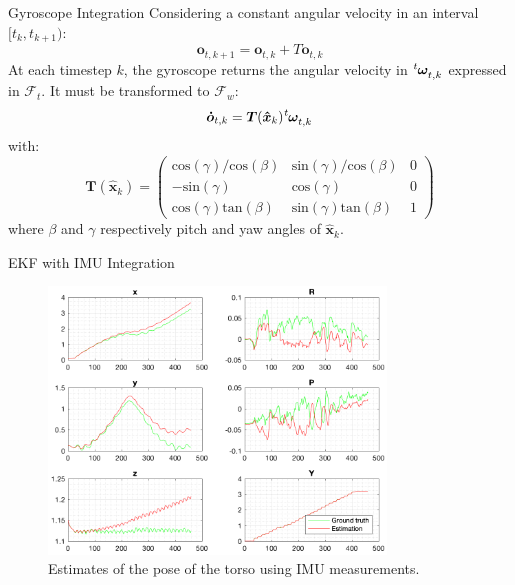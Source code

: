 \documentclass[10pt]{beamer}
\begin{document}
    \begin{frame}{Gyroscope Integration}
        Considering a constant angular velocity in an interval $[t_k, t_{k+1})$:
        \begin{equation*}
            \bm{o}_{t,k+1} = \bm{o}_{t,k} + T \bm{\dot{o}}_{t,k}
        \end{equation*}
        At each timestep $k$, the gyroscope returns the angular velocity in
        $\tensor[^t]{\bm{\omega}}{_{t,k}}$ expressed in $\mathcal{F}_t$.
        It must be transformed to $\mathcal{F}_w$:
        \begin{equation*}
            \bm{\dot{o}}_{t,k} = \bm{T}(\bm{\hat{x}}_{k}) \tensor[^t]{\bm{\omega}}{_{t,k}}
        \end{equation*}
        with:
        \begin{equation*}
            \bm{T}(\bm{\hat{x}}_{k}) =
            \begin{pmatrix}
                \text{cos}(\gamma)/\text{cos}(\beta) & \text{sin}(\gamma)/\text{cos}(\beta) & 0 \\
                -\text{sin}(\gamma) &  \text{cos}(\gamma) & 0 \\
                \text{cos}(\gamma) \text{tan}(\beta) & \text{sin}(\gamma) \text{tan}(\beta) & 1
            \end{pmatrix}
        \end{equation*}
        where $\beta$ and $\gamma$  respectively
        pitch and yaw angles of $\bm{\hat{x}}_{k}$.
    \end{frame}

    \begin{frame}{EKF with IMU Integration}
        \begin{figure}
        \caption{Estimates of the pose of the torso using IMU measurements.}
        \vspace{-0.3cm}
        \includegraphics[width=0.8\textwidth]{images/accelerometer.png}
        \end{figure}
    \end{frame}
\end{document}
